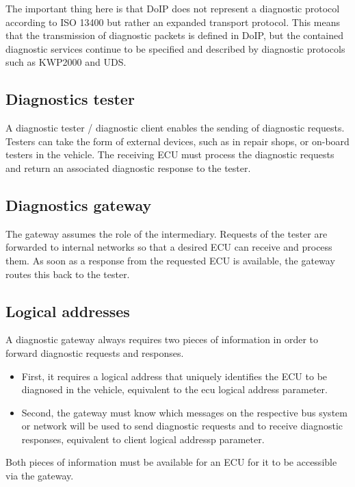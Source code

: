 The important thing here is that DoIP does not represent a diagnostic protocol according to ISO 13400 but rather 
an expanded transport protocol. This means that the transmission of diagnostic packets is defined in DoIP, but the 
contained diagnostic services continue to be specified and described by diagnostic protocols such as KWP2000 and UDS.

\subsection{Diagnostics tester} 
A diagnostic tester / diagnostic client enables the sending of diagnostic requests. Testers can take the form of 
external devices, such as in repair shops, or on-board testers in the vehicle. 
The receiving ECU must process the diagnostic requests and return an associated diagnostic response to the tester.

\subsection{Diagnostics gateway}
The gateway assumes the role of the intermediary. 
Requests of the tester are forwarded to internal networks so that a desired ECU can receive and process them. As 
soon as a response from the requested ECU is available, the gateway routes this back to the tester.

\subsection{Logical addresses} 
A diagnostic gateway always requires two pieces of information in order to forward diagnostic requests and responses. 
  \begin{itemize}
  \item First, it requires a logical address that uniquely identifies the ECU to be diagnosed in the vehicle, equivalent 
  to the ecu logical address parameter.

  \item Second, the gateway must know which messages on the respective bus system or network will be used to send diagnostic
   requests and to receive diagnostic responses, equivalent to client logical addressp parameter.
  \end{itemize}
Both pieces of information must be available for an ECU for it to be accessible via the gateway.
